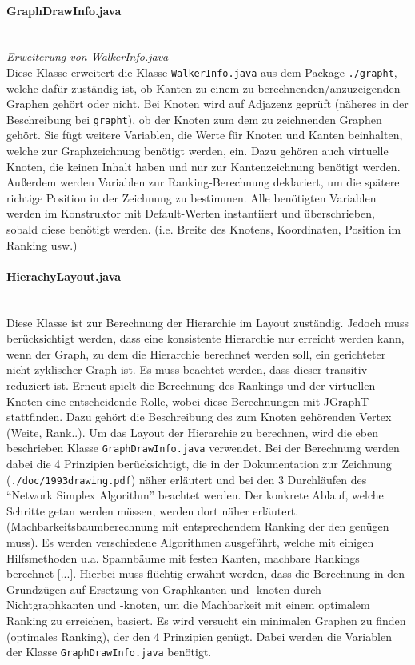\documentclass[10pt,a4paper]{article}
\newcommand{\G}[1]{\glqq\text{#1}\grqq} %
\begin{document}
\paragraph{GraphDrawInfo.java}\ \\
\emph{Erweiterung von WalkerInfo.java}\\
{\footnotesize Diese Klasse erweitert die Klasse \texttt{WalkerInfo.java} aus dem Package \texttt{./grapht}, welche dafür zuständig ist, ob Kanten zu einem zu berechnenden/anzuzeigenden Graphen gehört oder nicht. Bei Knoten wird auf Adjazenz geprüft (näheres in der Beschreibung bei \texttt{grapht}), ob der Knoten zum dem zu zeichnenden Graphen gehört. Sie fügt weitere Variablen, die Werte für Knoten und Kanten beinhalten, welche zur Graphzeichnung benötigt werden, ein. Dazu gehören auch virtuelle Knoten, die keinen Inhalt haben und nur zur Kantenzeichnung benötigt werden. Außerdem werden Variablen zur Ranking-Berechnung deklariert, um die spätere richtige Position in der Zeichnung zu bestimmen. Alle benötigten Variablen werden im Konstruktor mit Default-Werten instantiiert und überschrieben, sobald diese benötigt werden. (i.e. Breite des Knotens, Koordinaten, Position im Ranking usw.)}

\paragraph{HierachyLayout.java}\ \\
{\footnotesize Diese Klasse ist zur Berechnung der Hierarchie im Layout zuständig. Jedoch muss berücksichtigt werden, dass eine konsistente Hierarchie nur erreicht werden kann, wenn der Graph, zu dem die Hierarchie berechnet werden soll, ein gerichteter nicht-zyklischer Graph ist. Es muss beachtet werden, dass dieser transitiv reduziert ist. Erneut spielt die Berechnung des Rankings und der virtuellen Knoten eine entscheidende Rolle, wobei diese Berechnungen mit JGraphT stattfinden. Dazu gehört die Beschreibung des zum Knoten gehörenden Vertex (Weite, Rank..). Um das Layout der Hierarchie zu berechnen, wird die eben beschrieben Klasse \texttt{GraphDrawInfo.java} verwendet. Bei der Berechnung werden dabei die 4 Prinzipien berücksichtigt, die in der Dokumentation zur Zeichnung (\texttt{./doc/1993drawing.pdf}) näher erläutert und bei den 3 Durchläufen des "`Network Simplex Algorithm"' beachtet werden. Der konkrete Ablauf, welche Schritte getan werden müssen, werden dort näher erläutert. (Machbarkeitsbaumberechnung mit entsprechendem Ranking der den \G{length-constraints} genügen muss).  Es werden verschiedene Algorithmen ausgeführt, welche mit einigen Hilfsmethoden u.a. Spannbäume mit festen Kanten, machbare Rankings berechnet [...]. Hierbei muss flüchtig erwähnt werden, dass die Berechnung in den Grundzügen auf Ersetzung von Graphkanten und -knoten durch Nichtgraphkanten und -knoten, um die Machbarkeit mit einem optimalem Ranking zu erreichen, basiert. Es wird versucht ein minimalen Graphen zu finden (optimales Ranking), der den 4 Prinzipien genügt. Dabei werden die Variablen der Klasse \texttt{GraphDrawInfo.java} benötigt.} 
\end{document}
